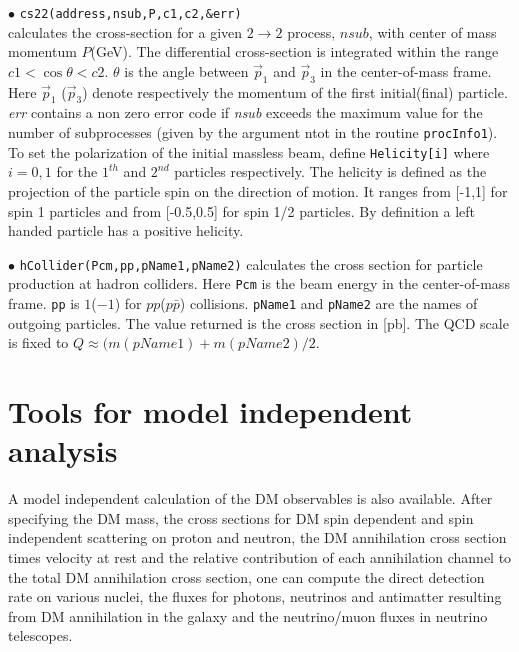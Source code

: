 \documentclass[12pt,a4paper]{article}
\begin{document}
\noindent
$\bullet$ \verb|cs22(address,nsub,P,c1,c2,&err)|\\
calculates  the cross-section for a given $2\rightarrow 2$
process, $nsub$, with  center of mass momentum $P$(GeV). The
differential cross-section is integrated
 within the range  $ c1 < \cos\theta <c2 $. $\theta$ is
the angle between $\vec{p}_1$ and $\vec{p}_3$  in the
center-of-mass frame. Here $\vec{p}_1$ ($\vec{p}_3$) denote
respectively the momentum of the first initial(final) particle.
{\it err} contains a non zero error code if {\it nsub} exceeds the
maximum value  for the number of subprocesses (given by the
argument ntot in the routine {\tt procInfo1}). To set the polarization 
of the initial massless beam, define   \verb|Helicity[i]|  where $i=0,1$ 
for the $1^{th}$ and $2^{nd}$ particles respectively.
The   helicity is defined as the projection of the particle spin
on the direction of motion. It ranges from  [-1,1] for spin 1 particles and 
from [-0.5,0.5]  for spin 1/2 particles.
By definition a left handed particle has a positive
helicity. 


\noindent$\bullet$ \verb|hCollider(Pcm,pp,pName1,pName2)| calculates the cross
section for particle production at hadron colliders. Here \verb|Pcm| 
is the beam energy  in the center-of-mass frame. \verb|pp| is
$1$($-1$) for $pp$($p\bar{p}$) collisions. 
{\tt pName1} and {\tt pName2} are the names of outgoing
particles. The value returned  is the cross section in [pb]. 
The QCD scale is fixed to $Q\approx (m(pName1)+m(pName2)/2$.



\section{Tools for model independent analysis}

A model independent calculation of the DM observables is also available.
After specifying the DM mass, the cross sections for DM  spin dependent and  spin independent scattering on proton and neutron, the DM annihilation cross section times velocity at rest and the relative contribution of  each annihilation channel to the total DM annihilation cross section, one can compute the direct detection rate on   various nuclei, the fluxes for photons, neutrinos and antimatter resulting from DM annihilation in the galaxy and the neutrino/muon fluxes in neutrino telescopes.  
\end{document}
